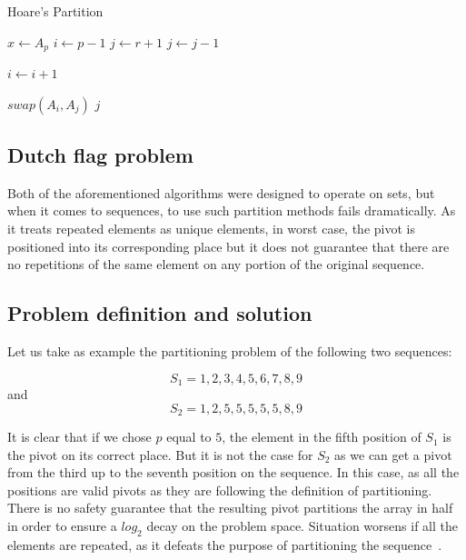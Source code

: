 \begin{algorithm}
\caption{Hoare's Partition}\label{ALG:HOARE_PARTITION}
\begin{algorithmic}[1]
    \State $x \gets A_p$
    \State $i \gets p-1$
    \State $j \gets r+1$
        \Do 
            \State $j \gets j - 1$

        \Do 
            \State $i \gets i + 1$

            \State $swap(A_i, A_j)$
        \Else
            \State \Return $j$
        \EndIf
    \EndWhile
    \EndProcedure
\end{algorithmic}
\end{algorithm}

\subsection{Dutch flag problem}
\label{SUBSEC:DUTCH_FLAG_PROBLEM}
Both of the aforementioned algorithms were designed to operate on sets, but when it comes to sequences, to use such partition methods fails dramatically. As it treats repeated elements as unique elements, in worst case, the pivot is positioned into its corresponding place but it does not guarantee that there are no repetitions of the same element on any portion of the original sequence.

\subsection{Problem definition and solution}
\label{SUBSECITON:PARTITIONING_PROBLEM}
Let us take as example the partitioning problem of the following two sequences:

$$ S_1={1,2,3,4,5,6,7,8,9} $$
and
$$S_2={1,2,5,5,5,5,5,8,9}$$

It is clear that if we chose $p$ equal to $5$, the element in the fifth position of $S_1$ is the pivot on its correct place. But it is not the case for $S_2$ as we can get a pivot from the third up to the seventh position on the sequence. In this case, as all the positions are valid pivots as they are following the definition of partitioning. There is no safety guarantee that the resulting pivot  partitions the array in half in order to ensure a $log_2$ decay on the problem space. Situation worsens if all the elements are repeated, as it defeats the purpose of partitioning the sequence~\cite{7416566}.


